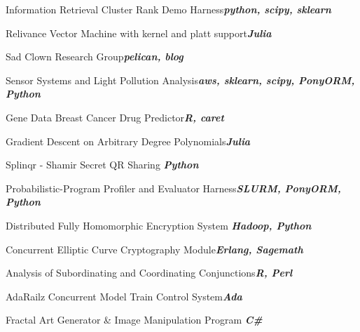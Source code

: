 \documentclass{article}
\newenvironment{**mylist}[2]{
  \subsubsection*{#1\hfill\small#2}
  \small
  \begin{list}{}{}
   \setlength{\topsep}{0pt}
   \setlength{\itemsep}{1pt}
   \setlength{\parskip}{0pt}
   \setlength{\parsep}{0pt}}{\end{list}\normalsize}
\newcommand{\LUx}[1]{{\bf\em #1}}
\begin{document}
\small
\vspace{-.08in}\begin{**mylist}{}{}
\item Information Retrieval Cluster Rank Demo Harness\hfill\LUx{python, scipy, sklearn}
\item Relivance Vector Machine with kernel and platt support\hfill\LUx{Julia}
\item Sad Clown Research Group\hfill\LUx{pelican, blog}
\item Sensor Systems and Light Pollution Analysis\hfill\LUx{aws, sklearn, scipy, PonyORM, Python}
\item Gene Data Breast Cancer Drug Predictor\hfill\LUx{R, caret}
\item Gradient Descent on Arbitrary Degree Polynomials\hfill\LUx{Julia}
\item Splinqr - Shamir Secret QR Sharing \hfill\LUx{Python}
\item Probabilistic-Program Profiler and Evaluator Harness\hfill\LUx{SLURM, PonyORM, Python}
\item Distributed Fully Homomorphic Encryption System \hfill\LUx{Hadoop, Python}
\item Concurrent Elliptic Curve Cryptography Module\hfill\LUx{Erlang, Sagemath}
\item Analysis of Subordinating and Coordinating Conjunctions\hfill\LUx{R, Perl}
\item AdaRailz Concurrent Model Train Control System\hfill\LUx{Ada}
\item Fractal Art Generator \& Image Manipulation Program \hfill\LUx{C\#}
\end{**mylist}
\normalsize
\end{document}
